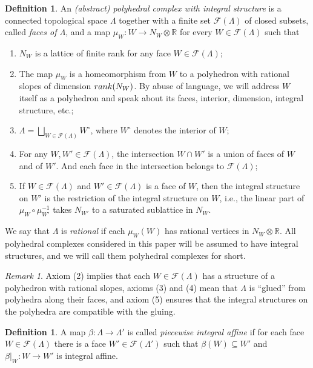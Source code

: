 \documentclass[11pt,reqno]{amsart}
\numberwithin{equation}{section}
\theoremstyle{definition}
\newtheorem{defn}[thm]{Definition}
\newcommand{\rank}{{\rm rank}}
\newcommand{\RR}{{\mathbb R}}
\theoremstyle{remark}
\newtheorem{rem}[thm]{Remark}
\begin{document}
\begin{defn}\label{defn:abstract poly complex}
    An \textit{(abstract) polyhedral complex with integral structure} is a connected topological space $\Lambda$ together with a finite set $\mathcal F(\Lambda)$ of closed subsets, called {\em faces of $\Lambda$}, and a map $\mu_W\colon W\rightarrow N_W\otimes\RR$ for every $W\in\mathcal F(\Lambda)$ such that 
    \begin{enumerate}
        \item $N_W$ is a lattice of finite rank for any face $W\in\mathcal F(\Lambda)$;
        \item The map $\mu_W$ is a homeomorphism from $W$ to a polyhedron with rational slopes of dimension $\rank(N_W)$. By abuse of language, we will address $W$ itself as a polyhedron and speak about its faces, interior, dimension, integral structure, etc.;
        \item $\Lambda=\bigsqcup_{W\in\mathcal F(\Lambda)}W^\circ$, where $W^\circ$ denotes the interior of $W$;
        \item For any $W,W'\in\mathcal F(\Lambda)$, the intersection $W\cap W'$ is a union of faces of $W$ and of $W'$. And each face in the intersection belongs to $\mathcal F(\Lambda)$;        
        \item If $W\in\mathcal F(\Lambda)$ and $W'\in\mathcal F(\Lambda)$ is a face of $W$, then the integral structure on $W'$ is the restriction of the integral structure on $W$, i.e., the linear part of $\mu_W\circ \mu_{W'}^{-1}$ takes $N_{W'}$ to a saturated sublattice in $N_W$.
    \end{enumerate}
    We say that $\Lambda$ is {\em rational} if each $\mu_W(W)$ has rational vertices in $N_W\otimes\RR$. All polyhedral complexes considered in this paper will be assumed to have integral structures, and we will call them polyhedral complexes for short.
\end{defn}
\begin{rem}
    Axiom (2) implies that each $W\in\mathcal F(\Lambda)$ has a structure of a polyhedron with rational slopes, axioms (3) and (4) mean that $\Lambda$ is ``glued'' from polyhedra along their faces, and axiom (5) ensures that the integral structures on the polyhedra are compatible with the gluing.
\end{rem}

\begin{defn}
    A map $\beta\colon \Lambda\rightarrow \Lambda'$ is called \textit{piecewise integral affine} if for each face $W\in\mathcal F(\Lambda)$ there is a face $W'\in\mathcal F(\Lambda')$ such that $\beta(W)\subseteq W'$ and $\beta|_W\colon W\to W'$ is integral affine.
\end{defn}
\end{document}
